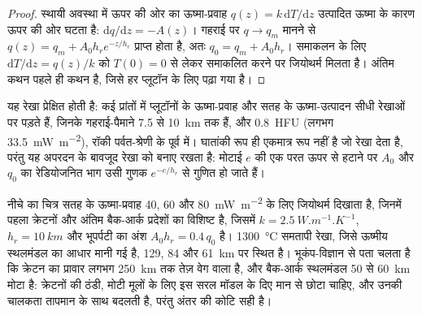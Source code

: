\begin{proof}
स्थायी अवस्था में ऊपर की ओर का ऊष्मा-प्रवाह $q(z) = k\,\mathrm dT/\mathrm dz$
उत्पादित ऊष्मा के कारण ऊपर की ओर घटता है: $\mathrm dq/\mathrm dz = -A(z)$। गहराई पर $q \to q_m$ मानने से
$q(z) = q_m + A_0h_re^{-z/h_r}$ प्राप्त होता है, अतः $q_0 = q_m + A_0h_r$। समाकलन के लिए
$\mathrm dT/\mathrm dz = q(z)/k$ को $T(0) = 0$ से लेकर समाकलित करने पर जियोथर्म मिलता है। अंतिम
कथन पहले ही कथन है, जिसे हर प्लूटॉन के लिए पढ़ा गया है।
\end{proof}

यह रेखा प्रेक्षित होती है: कई प्रांतों में प्लूटॉनों के ऊष्मा-प्रवाह और सतह के
ऊष्मा-उत्पादन सीधी रेखाओं पर पड़ते हैं, जिनके गहराई-पैमाने 7.5 से
\qty{10}{km} तक हैं, और  \qty{0.8}{HFU} (लगभग
\qty{33.5}{mW.m^{-2}}), रॉकी पर्वत-श्रेणी के पूर्व में।
घातांकी रूप ही एकमात्र रूप नहीं है जो रेखा देता है, परंतु यह अपरदन के बावजूद रेखा को बनाए रखता है: मोटाई $e$ की एक परत ऊपर से हटाने पर
$A_0$ और $q_0$ का रेडियोजनित भाग उसी गुणक $e^{-e/h_r}$ से गुणित हो जाते हैं।

नीचे का चित्र सतह के ऊष्मा-प्रवाह 40, 60 और
\qty{80}{mW.m^{-2}} के लिए जियोथर्म दिखाता है, जिनमें पहला क्रेटनों और अंतिम बैक-आर्क
प्रदेशों का विशिष्ट है, जिसमें $k = \qty{2.5}{W.m^{-1}.K^{-1}}$, $h_r = \qty{10}{km}$ और
भूपर्पटी का अंश $A_0h_r = 0.4\,q_0$ है। \qty{1300}{\celsius} समतापी रेखा, जिसे
ऊष्मीय स्थलमंडल का आधार मानी गई है, 129, 84 और \qty{61}{km} पर स्थित है।
भूकंप-विज्ञान से पता चलता है कि क्रेटन का प्रावार लगभग \qty{250}{km} तक तेज़ वेग वाला है, और बैक-आर्क
स्थलमंडल 50 से \qty{60}{km} मोटा है: क्रेटनों की ठंडी, मोटी मूलों के लिए
इस सरल मॉडल के दिए मान से छोटा  चाहिए, और उनकी
चालकता तापमान के साथ बदलती है, परंतु अंतर की कोटि सही है।


